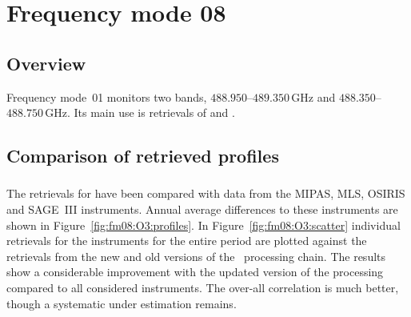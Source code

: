 \section{Frequency mode 08}
\label{sec:fm08}

\subsection{Overview}
\label{sec:fm08:overview}
Frequency mode~01 monitors two bands, $488.950$--$489.350\,\mathrm{GHz}$ and
$488.350$--$488.750\,\mathrm{GHz}$. Its main use is retrievals of 
and .


\subsection{Comparison of retrieved profiles}
\label{sec:fm08:comparison}



\subsubsection{}
\label{sec:fm08:comparison:O3}
The retrievals for  have been compared with data from the MIPAS, MLS,
OSIRIS and SAGE~III instruments. Annual average differences to these
instruments are shown in Figure~\ref{fig:fm08:O3:profiles}. In
Figure~\ref{fig:fm08:O3:scatter} individual retrievals for the instruments for
the entire period are plotted against the retrievals from the new and old
versions of the \smr\ processing chain. The results show a considerable
improvement with the updated version of the processing compared to all
considered instruments. The over-all correlation is much better, though a
systematic under estimation remains.

